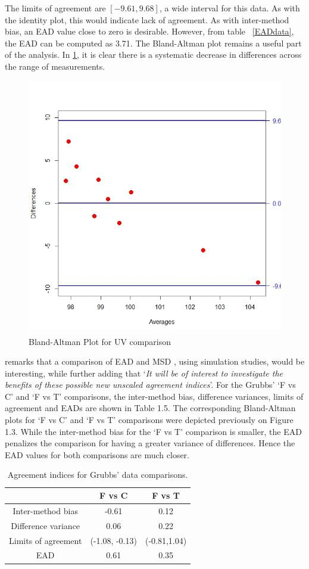 \documentclass[12pt, a4paper]{report}
\theoremstyle{plain}
\theoremstyle{definition}
\theoremstyle{remark}
\begin{document}
	The limits of agreement are $[-9.61, 9.68]$, a wide interval for this data. As with the identity plot, this would indicate lack of agreement. As with inter-method bias, an EAD value close to zero is desirable. However, from table ~\ref{EADdata}, the EAD can be computed as 3.71. The Bland-Altman plot remains a useful part of the analysis. In \ref{fig:EAD1}, it is clear there is a systematic decrease in differences across the range of measurements.
	\begin{figure}
		\centering
		\includegraphics[width=0.7\linewidth]{images/EAD1}
		\caption{Bland-Altman Plot for UV comparison}
		\label{fig:EAD1}
	\end{figure}
	
	\citet{Barnhart} remarks that a comparison of EAD and MSD , using
	simulation studies, would be interesting, while further adding
	that `\textit{It will be of interest to investigate the benefits of these
		possible new unscaled agreement indices}'. For the Grubbs' `F vs C' and `F vs T' comparisons, the inter-method bias, difference variances, limits of agreement and EADs are shown
	in Table 1.5. The corresponding Bland-Altman plots for `F vs C' and `F vs T' comparisons were depicted previously on Figure 1.3. While the inter-method bias for the `F vs T' comparison is smaller, the EAD penalizes the comparison for having a greater variance of differences. Hence the EAD values for both comparisons are much closer.
	\begin{table}[ht]
		\begin{center}
			\begin{tabular}{|c||c|c|}
				\hline
				& F vs C & F vs T  \\\hline
				\hline
				Inter-method bias & -0.61 & 0.12 \\ \hline
				Difference variance & 0.06 & 0.22  \\ \hline 
				Limits of agreement & (-1.08,	-0.13) & (-0.81,1.04) \\ \hline
				EAD & 0.61 & 0.35  \\ \hline 

			\end{tabular}
			\caption{Agreement indices for Grubbs' data comparisons.}
		\end{center}
	\end{table}
	
\end{document}
